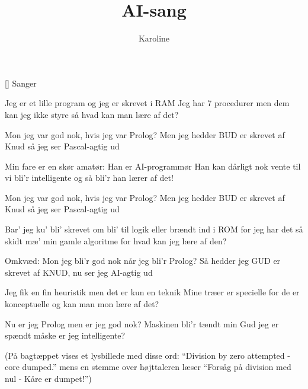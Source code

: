 \documentclass[a4paper,11pt]{article}
\title{AI-sang}
\author{Karoline}
\begin{document}
\maketitle

\begin{roles}
[] Sanger
\end{roles}

\begin{song}
Jeg er et lille program
og jeg er skrevet i RAM
Jeg har 7 procedurer
men dem kan jeg ikke styre
så hvad kan man lære af det?

Mon jeg var god nok,
hvis jeg var Prolog?
Men jeg hedder BUD
er skrevet af Knud
så jeg ser Pascal-agtig ud

Min fare er en skør amatør:
Han er AI-programmør
Han kan dårligt nok vente
til vi bli'r intelligente
og så bli'r han lærer af det!

Mon jeg var god nok,
hvis jeg var Prolog?
Men jeg hedder BUD
er skrevet af Knud
så jeg ser Pascal-agtig ud

Bar' jeg ku' bli' skrevet om
bli' til logik eller brændt ind i ROM
for jeg har det så skidt mæ'
min gamle algoritme
for hvad kan jeg lære af den?

Omkvæd: Mon jeg bli'r god nok
når jeg bli'r Prolog?
Så hedder jeg GUD
er skrevet af KNUD,
nu ser jeg AI-agtig ud

Jeg fik en fin heuristik
men det er kun en teknik
Mine træer er specielle
for de er konceptuelle
og kan man mon lære af det?

Nu er jeg Prolog
men er jeg god nok?
Maskinen bli'r tændt
min Gud jeg er spændt
måske er jeg intelligente?

(På bagtæppet vises et lysbillede med disse ord: "`Division by zero
attempted - core dumped."' mens en stemme over højttaleren læser
"`Forsåg på division med nul - Kåre er dumpet!"')
\end{song}
\end{document}
